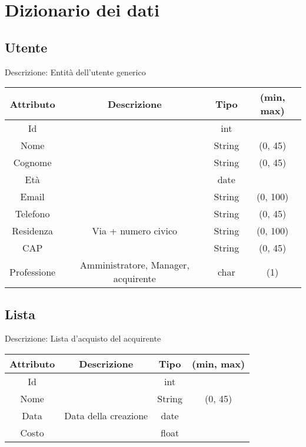 \chapter{Dizionario dei dati}


\section{Utente}
Descrizione: Entità dell'utente generico
\begin{center}
    \begin{tabular}{||c c c c||}
        \hline
        Attributo & Descrizione & Tipo & (min, max) \\ [0.5ex]
        \hline \hline
        Id &  & int &   \\
        Nome &  & String & (0, 45) \\
        Cognome &  & String & (0, 45) \\
        Età &  & date &  \\
        Email &  & String & (0, 100) \\
        Telefono & & String & (0, 45) \\
        Residenza & Via + numero civico & String & (0, 100) \\
        CAP &  & String & (0, 45) \\
        Professione & Amministratore, Manager, acquirente & char & (1) \\
        \hline
    \end{tabular}
\end{center}


\section{Lista}
Descrizione: Lista d'acquisto del acquirente
\begin{center}
    \begin{tabular}{||c c c c||}
        \hline
        Attributo & Descrizione & Tipo & (min, max) \\ [0.5ex]
        \hline \hline
        Id &  & int &  \\
        Nome &  & String & (0, 45) \\
        Data & Data della creazione & date &  \\
        Costo &  & float &  \\
        \hline
    \end{tabular}
\end{center}

\newpage
